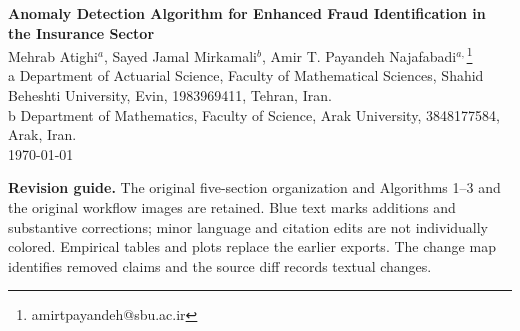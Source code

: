 

\begin{center}
{\bf Anomaly Detection Algorithm for Enhanced Fraud
Identification in the Insurance Sector}\\
{\sc Mehrab Atighi$^{a}$, Sayed Jamal Mirkamali$^{b}$,
Amir T. Payandeh Najafabadi$^{a,}$\footnote{amirtpayandeh@sbu.ac.ir}}\\
a Department of Actuarial Science, Faculty of Mathematical
Sciences, Shahid Beheshti University,
Evin, 1983969411, Tehran, Iran.\\
b Department of Mathematics, Faculty of Science, Arak University,
3848177584, Arak, Iran.\\
\today




\end{center}
\ifmarked
\noindent\colorbox{yellow!25}{\parbox{\dimexpr\linewidth-2\fboxsep}{
\textbf{Revision guide.} The original five-section organization and Algorithms
1--3 and the original workflow images are retained. Blue text marks additions and substantive corrections;
minor language and citation edits are not individually colored. Empirical
tables and plots replace the earlier exports. The change map identifies
removed claims and the source diff records textual changes.}}\medskip
\fi
\begin{abstract}
\begin{revised}
Insurance-fraud screening requires effective detection under class
imbalance and limited verification resources. Sequential Anomaly Detection
(SAD) uses an anomaly ensemble to select claims for review, then trains
eight supervised learners on verified records and updates them across
successive batches. Three architectures differ in their initial screening:
Simple-A uses nine anomaly detectors, Simple-B adds an entropy vote, and
Multilayer applies entropy after anomaly consensus. We evaluate these
architectures using ten repeated stratified random splits of Carclaims
(15,420 records; 5.99\% fraud) and Insurance Claims (1,000 records;
24.70\% fraud). Recorded outcomes simulate verification after case selection,
including random audits of non-alerted claims. At fixed voting thresholds
$(3,4)$, Simple-B achieves mean fraud F1 \ExtSimpleBFone{} and average
precision \ExtSimpleBAP{} on the second benchmark. Multilayer achieves F1
\ExtMultiFone{} at a review fraction of \ExtMultiReview{}. A frozen-model
ablation, ten classifiers trained under a common acquisition policy, and
a stricter threshold setting examine the effects on detection and workload.
The findings support assessment of both outcomes when selecting a review
policy; they do not establish universal architectural superiority or
prospective generalizability to an independent insurer.
\end{revised}
\end{abstract}
